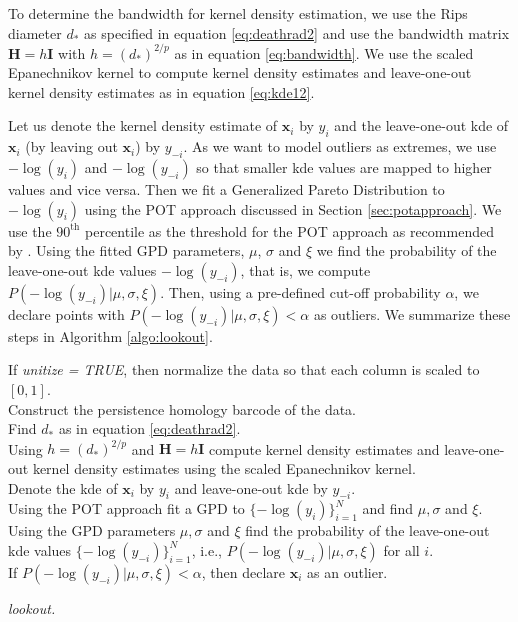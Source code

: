 \documentclass[11pt,a4paper,]{article}
\theoremstyle{definition}
\theoremstyle{definition}
\theoremstyle{definition}
\theoremstyle{remark}
\begin{document}
To determine the bandwidth for kernel density estimation, we use the Rips diameter \(d_*\) as specified in equation \eqref{eq:deathrad2} and use the bandwidth matrix \(\bm{H} = h \bm{I}\) with \(h = (d_*)^{2/p}\) as in equation \eqref{eq:bandwidth}. We use the scaled Epanechnikov kernel to compute kernel density estimates and leave-one-out kernel density estimates as in equation \eqref{eq:kde12}.

Let us denote the kernel density estimate of \(\bm{x}_i\) by \(y_i\) and the leave-one-out kde of \(\bm{x}_i\) (by leaving out \(\bm{x}_i\)) by \(y_{-i}\). As we want to model outliers as extremes, we use \(-\log(y_i)\) and \(-\log(y_{-i})\) so that smaller kde values are mapped to higher values and vice versa. Then we fit a Generalized Pareto Distribution to \(-\log(y_i)\) using the POT approach discussed in Section \ref{sec:potapproach}. We use the \(90^{\text{th}}\) percentile as the threshold for the POT approach as recommended by \textcite{bommier2014peaks}. Using the fitted GPD parameters, \(\mu\), \(\sigma\) and \(\xi\) we find the probability of the leave-one-out kde values \(-\log(y_{-i})\), that is, we compute \(P\left(-\log(y_{-i})|\mu, \sigma,\xi \right)\). Then, using a pre-defined cut-off probability \(\alpha\), we declare points with \(P\left(-\log(y_{-i})|\mu, \sigma,\xi \right) < \alpha\) as outliers. We summarize these steps in Algorithm \ref{algo:lookout}.
\DontPrintSemicolon

\begin{algorithm}\fontsize{11}{12}\selectfont
     If \textit{unitize = TRUE}, then normalize the data so that each column is scaled to $[0,1]$.\\
     Construct the persistence homology barcode of the data. \\
     Find $d_*$ as in equation \eqref{eq:deathrad2}. \\
     Using $h = (d_*)^{2/p}$ and $\bm{H} = h\bm{I}$ compute kernel density estimates  and leave-one-out kernel density estimates using the scaled Epanechnikov kernel. \\
     Denote the kde of $\bm{x}_i$ by $y_i$ and leave-one-out kde by $y_{-i}$.\\
     Using the POT approach fit a GPD to $\{-\log(y_i)\}_{i=1}^N$ and find $\mu, \sigma$ and $\xi$. \\
     Using the GPD parameters $\mu, \sigma$ and $\xi$ find the probability of the leave-one-out kde values $\{-\log(y_{-i})\}_{i=1}^N$, i.e., $P\left(-\log(y_{-i})|\mu, \sigma, \xi \right)$ for all $i$. \\
     If $P\left(-\log(y_{-i})|\mu, \sigma, \xi \right) < \alpha$, then declare $\bm{x}_i$ as an outlier. 
    \caption{\itshape lookout.}
    \label{algo:lookout}
\end{algorithm}
\end{document}
